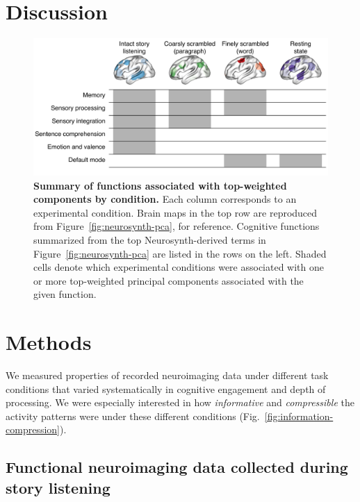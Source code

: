 \documentclass[english, 11pt]{article}
\begin{document}
\section*{Discussion}

\begin{figure}[tp]
  \centering
  \includegraphics[width=\textwidth]{figs/discussion}

\caption{\textbf{Summary of functions associated with top-weighted components
by condition.} Each column corresponds to an experimental condition. Brain maps
in the top row are reproduced from Figure~\ref{fig:neurosynth-pca}, for
reference. Cognitive functions summarized from the top Neurosynth-derived terms
in Figure~\ref{fig:neurosynth-pca} are listed in the rows on the left.  Shaded cells
denote which experimental conditions were associated with one or more top-weighted
principal components associated with the given function.}

\label{fig:discussion}
\end{figure}



\section*{Methods}

We measured properties of recorded neuroimaging data under different task
conditions that varied systematically in cognitive engagement and depth of
processing. We were especially interested in how \textit{informative} and
\textit{compressible} the activity patterns were under these different
conditions (Fig.~\ref{fig:information-compression}).


\subsection*{Functional neuroimaging data collected during story
  listening}
\end{document}
